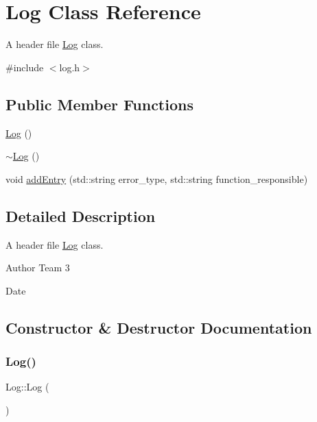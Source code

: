 \hypertarget{class_log}{}\section{Log Class Reference}
\label{class_log}


A header file \mbox{\hyperlink{class_log}{Log}} class.  




{\ttfamily \#include $<$log.\+h$>$}

\subsection*{Public Member Functions}
\begin{DoxyCompactItemize}
\item 
\mbox{\hyperlink{class_log_af6071a60aa52b6c1b511f99b4bc1b8fe}{Log}} ()
\item 
\mbox{\hyperlink{class_log_a0fbfda88fbee5027c89f6eb121059360}{$\sim$\+Log}} ()
\item 
void \mbox{\hyperlink{class_log_a1ccb79c34552336f3bd399b7c9b035d7}{add\+Entry}} (std\+::string error\+\_\+type, std\+::string function\+\_\+responsible)
\end{DoxyCompactItemize}


\subsection{Detailed Description}
A header file \mbox{\hyperlink{class_log}{Log}} class. 

\begin{DoxyAuthor}{Author}
Team 3 
\end{DoxyAuthor}
\begin{DoxyDate}{Date}

\end{DoxyDate}


\subsection{Constructor \& Destructor Documentation}
\mbox{\label{class_log_af6071a60aa52b6c1b511f99b4bc1b8fe}} 
\subsubsection{\texorpdfstring{Log()}{Log()}}
{\footnotesize\ttfamily Log\+::\+Log (\begin{DoxyParamCaption}{ }\end{DoxyParamCaption})}

